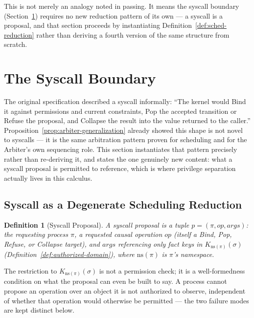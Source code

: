 \documentclass[11pt]{article}
\newtheorem{definition}{Definition}[section]
\begin{document}
This is not merely an analogy noted in passing. It means the syscall boundary (Section~\ref{sec:syscall}) requires no new reduction pattern of its own --- a syscall is a proposal, and that section proceeds by instantiating Definition~\ref{def:sched-reduction} rather than deriving a fourth version of the same structure from scratch.

\section{The Syscall Boundary}
\label{sec:syscall}

The original specification described a syscall informally: ``The kernel would Bind it against permissions and current constraints, Pop the accepted transition or Refuse the proposal, and Collapse the result into the value returned to the caller.'' Proposition~\ref{prop:arbiter-generalization} already showed this shape is not novel to syscalls --- it is the same arbitration pattern proven for scheduling and for the Arbiter's own sequencing role. This section instantiates that pattern precisely rather than re-deriving it, and states the one genuinely new content: what a syscall proposal is permitted to reference, which is where privilege separation actually lives in this calculus.

\subsection{Syscall as a Degenerate Scheduling Reduction}

\begin{definition}[Syscall Proposal]
\label{def:syscall-proposal}
A syscall proposal is a tuple $p = (\pi, \mathit{op}, \mathit{args})$: the requesting process $\pi$, a requested causal operation $\mathit{op}$ (itself a Bind, Pop, Refuse, or Collapse target), and $\mathit{args}$ referencing only fact keys in $K_{\mathrm{ns}(\pi)}(\sigma)$ (Definition~\ref{def:authorized-domain}), where $\mathrm{ns}(\pi)$ is $\pi$'s namespace.
\end{definition}

The restriction to $K_{\mathrm{ns}(\pi)}(\sigma)$ is not a permission check; it is a well-formedness condition on what the proposal can even be built to say. A process cannot propose an operation over an object it is not authorized to observe, independent of whether that operation would otherwise be permitted --- the two failure modes are kept distinct below.
\end{document}

